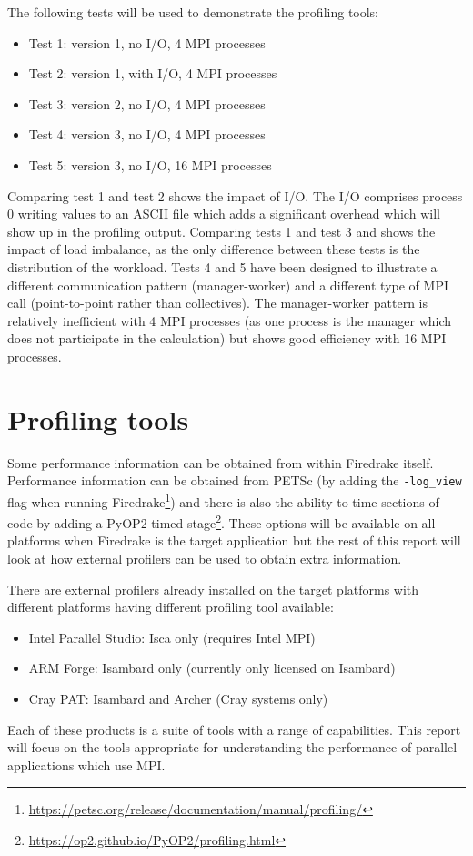 \documentclass[a4paper,titlepage]{article}
\begin{document}
The following tests will be used to demonstrate the profiling tools:
\begin{itemize}
\item Test 1: version 1, no I/O, 4 MPI processes
\item Test 2: version 1, with I/O, 4 MPI processes
\item Test 3: version 2, no I/O, 4 MPI processes
\item Test 4: version 3, no I/O, 4 MPI processes
\item Test 5: version 3, no I/O, 16 MPI processes 
\end{itemize}
Comparing test 1 and test 2 shows the impact of I/O. The I/O comprises process 0 writing values to an ASCII file which adds a significant overhead which will show up in the profiling output. Comparing tests 1 and test 3 and shows the impact of load imbalance, as the only difference between these tests is the distribution of the workload. 
Tests 4 and 5 have been designed to illustrate a different communication pattern (manager-worker) and a different type of MPI call (point-to-point rather than collectives). 
The manager-worker pattern is relatively inefficient with 4 MPI processes (as one process is the manager which does not participate in the calculation) but shows good efficiency with 16 MPI processes. 


\section{Profiling tools}
\label{section:profiling_tools}

Some performance information can be obtained from within Firedrake itself. Performance information can be obtained from PETSc (by adding the \verb+-log_view+ flag when running Firedrake\footnote{\url{https://petsc.org/release/documentation/manual/profiling/}}) and there is also the ability to time sections of code by adding a PyOP2 timed stage\footnote{\url{https://op2.github.io/PyOP2/profiling.html}}. These options will be available on all platforms when Firedrake is the target application but the rest of this report will look at how external profilers can be used to obtain extra information. 

There are external profilers already installed on the target platforms with different platforms having different profiling tool available:
%
\begin{itemize}
\item Intel Parallel Studio: Isca only (requires Intel MPI)
\item ARM Forge: Isambard only (currently only licensed on Isambard)
\item Cray PAT: Isambard and Archer (Cray systems only)
\end{itemize}
%
Each of these products is a suite of tools with a range of capabilities. This report will focus on the tools appropriate for understanding the performance of parallel applications which use MPI.
\end{document}
